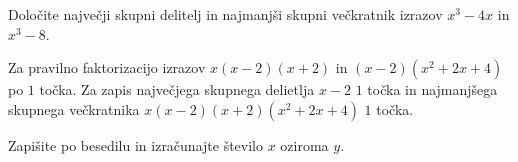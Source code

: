 \documentclass[addpoints]{exam}
\begin{document}
\begin{questions}


    \question[4]
    Določite največji skupni delitelj in najmanjši skupni večkratnik izrazov $x^3-4x$ in $x^3-8$.

    \begin{solution}[6cm]
        Za pravilno faktorizacijo izrazov $x(x-2)(x+2)$ in $(x-2)(x^2+2x+4)$ po $1$ točka. 
        Za zapis največjega skupnega delietlja $x-2$ $1$ točka in najmanjšega skupnega večkratnika $x(x-2)(x+2)(x^2+2x+4)$ $1$ točka.
    \end{solution}
    
    
    \question
    Zapišite po besedilu in izračunajte število $x$ oziroma $y$.




     \newpage

    



\end{questions}
\end{document}
